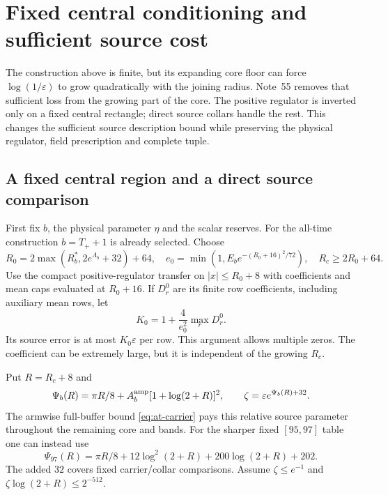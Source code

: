 \section{Fixed central conditioning and sufficient source cost}
\label{sec:source-conditioning}
The construction above is finite, but its expanding core floor can force
$\log(1/\varepsilon)$ to grow quadratically with the joining radius.
Note~55 \cite{n55} removes that sufficient loss from the growing part
of the core. The positive regulator is inverted only on a fixed central
rectangle; direct source collars handle the rest. This changes the
sufficient source description bound while preserving the physical
regulator, field prescription and complete tuple.

\subsection{A fixed central region and a direct source comparison}
First fix $b$, the physical parameter $\eta$ and the scalar reserves.
For the all-time construction $b=T_++1$ is already selected. Choose
\[
 R_0=2\max(R_b^*,2e^{\Lambda_b}+32)+64,\quad
 e_0=\min(1,E_be^{-(R_0+16)^2/72}),\quad R_c\ge2R_0+64.
\]
Use the compact positive-regulator transfer on $|x|\le R_0+8$ with
coefficients and mean caps evaluated at $R_0+16$. If $D_r^0$ are
its finite row coefficients, including auxiliary mean rows, let
\begin{equation}
 K_0=1+\frac4{e_0^2}\max_r D_r^0.
 \label{eq:sc-central}
\end{equation}
Its source error is at most $K_0\varepsilon$ per row. This argument
allows multiple zeros. The coefficient can be extremely large, but it
is independent of the growing $R_c$.

Put $R=R_c+8$ and
\begin{equation}
 \Psi_b(R)=\pi R/8+A_b^{\rm amp}[1+\log(2+R)]^2,
 \qquad \zeta=\varepsilon e^{\Psi_b(R)+32}.
 \label{eq:sc-carrier-parameter}
\end{equation}
The armwise full-buffer bound \eqref{eq:at-carrier} pays this relative
source parameter throughout the remaining core and bands. For the
sharper fixed $[95,97]$ table one can instead use
\begin{equation}
 \Psi_{97}(R)=\pi R/8+12\log^2(2+R)+200\log(2+R)+202.
 \label{eq:sc-carrier97}
\end{equation}
The added $32$ covers fixed carrier/collar comparisons.
Assume $\zeta\le e^{-1}$ and $\zeta\log(2+R)\le2^{-512}$.

